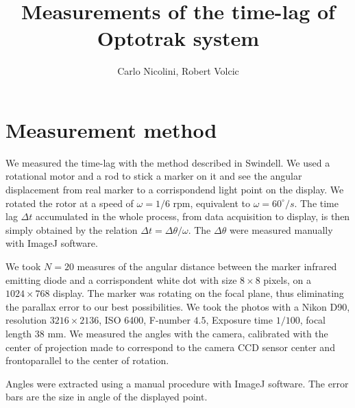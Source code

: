 \documentclass[a4paper]{article}  %
\title{Measurements of the time-lag of Optotrak system}
\author{Carlo Nicolini, Robert Volcic}
\begin{document}
\maketitle 
\section{Measurement method}
We measured the time-lag with the method described in Swindell. We used a rotational motor and a rod to stick a marker on it and see the angular displacement from real marker to a corrispondend light point on the display.
We rotated the rotor at a speed of $\omega = 1/6$ rpm, equivalent to $\omega = 60^\circ/s$. The time lag $\Delta t$ accumulated in the whole process, from data acquisition to display, is then simply obtained by the relation $\Delta t = \Delta \theta / \omega$. The $\Delta \theta$ were measured manually with ImageJ software.

We took $N=20$ measures of the angular distance between the marker infrared emitting diode and a corrispondent white dot with size $8\times 8$ pixels, on a $1024 \times 768$ display. The marker was rotating on the focal plane, thus eliminating the parallax error to our best possibilities.
We took the photos with a Nikon D90, resolution $3216 \times 2136$, ISO 6400, F-number $4.5$, Exposure time $1/100$, focal length $38$ mm.
We measured the angles with the camera, calibrated with the center of projection made to correspond to the camera CCD sensor center and frontoparallel to the center of rotation. 

Angles were extracted using a manual procedure with ImageJ software. The error bars are the size in angle of the displayed point.
\end{document}
